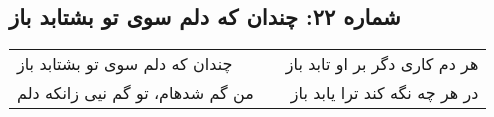 \begin{center}
\section*{شماره ۲۲: چندان که دلم سوی تو بشتابد باز}
\label{sec:022}
\begin{longtable}{l p{0.5cm} r}
چندان که دلم سوی تو بشتابد باز
&&
هر دم کاری دگر بر او تابد باز
\\
من گم شدهام، تو گم نیی زانکه دلم
&&
در هر چه نگه کند ترا یابد باز
\\
\end{longtable}
\end{center}
